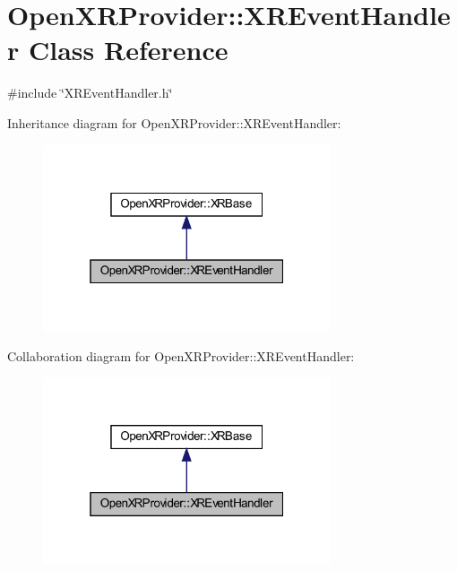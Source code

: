 \hypertarget{class_open_x_r_provider_1_1_x_r_event_handler}{}\section{Open\+X\+R\+Provider\+::X\+R\+Event\+Handler Class Reference}
\label{class_open_x_r_provider_1_1_x_r_event_handler}


{\ttfamily \#include \char`\"{}X\+R\+Event\+Handler.\+h\char`\"{}}



Inheritance diagram for Open\+X\+R\+Provider\+::X\+R\+Event\+Handler\+:\nopagebreak
\begin{figure}[H]
\begin{center}
\leavevmode
\includegraphics[width=241pt]{class_open_x_r_provider_1_1_x_r_event_handler__inherit__graph}
\end{center}
\end{figure}


Collaboration diagram for Open\+X\+R\+Provider\+::X\+R\+Event\+Handler\+:\nopagebreak
\begin{figure}[H]
\begin{center}
\leavevmode
\includegraphics[width=241pt]{class_open_x_r_provider_1_1_x_r_event_handler__coll__graph}
\end{center}
\end{figure}
